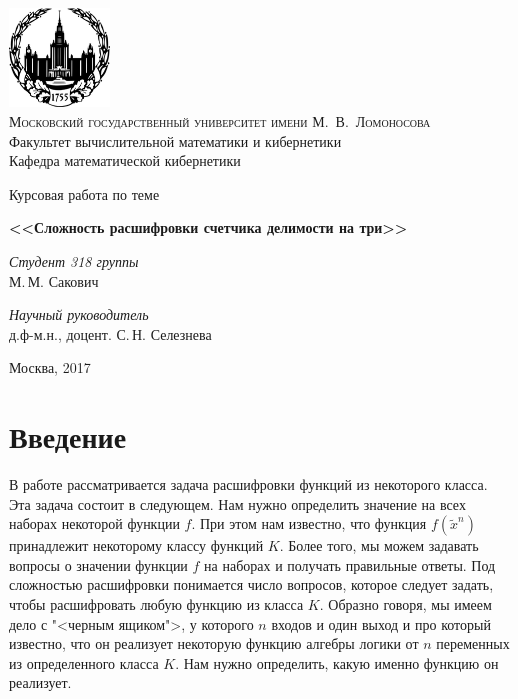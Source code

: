\documentclass[oneside, final, 14pt]{extreport}
\begin{document}
	\renewcommand\contentsname{Содержание} %
	\thispagestyle{empty}
	
	\begin{center}
		\ \vspace{-1cm}
		
		\includegraphics[width=0.2\textwidth]{logo-mgu.png}\\
		{\scshape Московский государственный университет имени М.~В.~Ломоносова}\\
		Факультет вычислительной математики и кибернетики\\
		Кафедра математической кибернетики
		
		\vfill
		
		{\LARGE Курсовая работа по теме}
		
		\vspace{1cm}
		
		{\Huge\bfseries <<Сложность расшифровки счетчика делимости на три>>}
	\end{center}
	
	\vspace{1cm}
	
	\begin{flushright}
		\large
		\textit{Студент 318 группы}\\
		М.\,М. Сакович
		
		\vspace{5mm}
		
		\textit{Научный руководитель}\\
		д.ф-м.н., доцент. С.\,Н. Селезнева
	\end{flushright}
	
	\vfill
	
	\begin{center}
		Москва, 2017
	\end{center}

	\tableofcontents
	\chapter*{Введение}
	
	В работе рассматривается задача расшифровки функций из некоторого класса. Эта задача состоит в следующем. Нам нужно определить значение 
	на всех наборах некоторой функции $f$. При этом нам известно, что функция $f(\tilde{x}^n)$ принадлежит некоторому классу функций $K$.
	Более того, мы можем задавать вопросы о значении функции $f$ на наборах и получать правильные ответы. Под сложностью расшифровки
	понимается число вопросов, которое следует задать, чтобы расшифровать любую функцию из класса $K$. Образно говоря, мы имеем дело 
	с "<черным ящиком">, у которого $n$ входов и один выход и про который известно, что он реализует некоторую функцию алгебры логики от $n$
	переменных из определенного класса $K$. Нам нужно определить, какую именно функцию он реализует.
	
\end{document}
